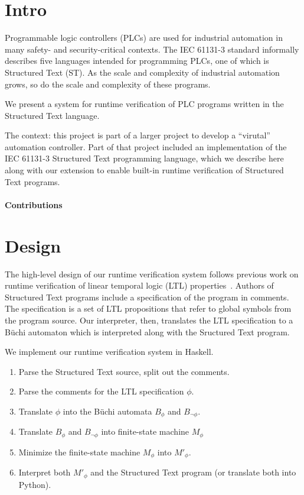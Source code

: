% 

\section{Intro}

Programmable logic controllers (PLCs) are used for industrial automation in many
safety- and security-critical contexts. The IEC 61131-3 standard informally
describes five languages intended for programming PLCs, one of which is
Structured Text (ST). As the scale and complexity of industrial automation grows, so
do the scale and complexity of these programs.

We present a system for runtime verification of PLC programs written in the
Structured Text language.

The context: this project is part of a larger project to develop a ``virutal''
automation controller. Part of that project included an implementation of the
IEC 61131-3 Structured Text programming language, which we describe here along
with our extension to enable built-in runtime verification of Structured Text
programs.

\paragraph{Contributions}

\section{Design}

The high-level design of our runtime verification system follows previous work
on runtime verification of linear temporal logic (LTL)
properties~\cite{bauer:rv_ltl}. Authors of Structured Text programs include a
specification of the program in comments. The specification is a set of LTL
propositions that refer to global symbols from the program source. Our
interpreter, then, translates the LTL specification to a B\"uchi automaton which
is interpreted along with the Sructured Text program.

We implement our runtime verification system in Haskell.

\begin{enumerate}
\item Parse the Structured Text source, split out the comments.
\item Parse the comments for the LTL specification $\phi$.
\item Translate $\phi$ into the B\"uchi automata $B_\phi$ and $B_{\lnot\phi}$.
\item Translate $B_\phi$ and $B_{\lnot\phi}$ into finite-state machine $M_\phi$
\item Minimize the finite-state machine $M_\phi$ into $M'_\phi$.
\item Interpret both $M'_\phi$ and the Structured Text program (or translate
both into Python).
\end{enumerate}

